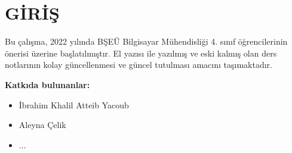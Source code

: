 \section{GİRİŞ}
Bu çalışma, 2022 yılında BŞEÜ Bilgisayar Mühendisliği 4. sınıf öğrencilerinin önerisi üzerine başlatılmıştır. El yazısı ile yazılmış ve eski kalmış olan ders notlarının kolay güncellenmesi ve güncel tutulması amacını taşımaktadır.

\textbf{Katkıda bulunanlar:}
\begin{itemize}
    \item İbrahim Khalil Atteib Yacoub
    \item Aleyna Çelik
    \item ...
\end{itemize}